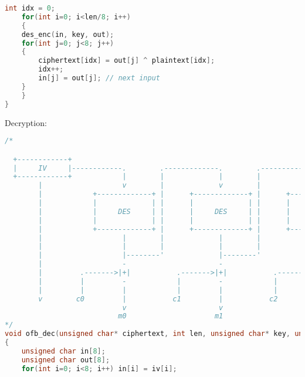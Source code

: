\documentclass{article}
\begin{document}
\begin{lstlisting}[language=c]
    int idx = 0;
    for(int i=0; i<len/8; i++)
    {
	des_enc(in, key, out);
	for(int j=0; j<8; j++)
	{
	    ciphertext[idx] = out[j] ^ plaintext[idx];
	    idx++;
	    in[j] = out[j]; // next input
	}
    }
}
\end{lstlisting}

Decryption:
\begin{lstlisting}[language=c]
/*

  +------------+                                                   
  |     IV     |------------.        .-------------.        .-------------.        .-  ...                                                                      
  +------------+            |        |             |        |             |        |                                                    
        |                   v        |             v        |             v        |                                                      
        |            +-------------+ |      +-------------+ |      +-------------+ |                                                
        |            |             | |      |             | |      |             | |                                                    
        |            |     DES     | |      |     DES     | |      |     DES     | |                                                      
        |            |             | |      |             | |      |             | |                                                    
        |            +-------------+ |      +-------------+ |      +-------------+ |                                                  
        |                   |        |             |        |             |        |                                                   
        |                   |        |             |        |             |        |                                                   
        |                   |--------'             |--------'             |--------'                                                   
        |                   -                      -                      -                                                                
        |         .------->|+|           .------->|+|           .------->|+|                                                             
        |         |         -            |         -            |         -                                                            
        |         |         |            |         |            |         |                                                             
        v        c0         |           c1         |           c2         |                                                               
                            v                      v                      v                                                          
                           m0                     m1                     m2                                                          
*/
void ofb_dec(unsigned char* ciphertext, int len, unsigned char* key, unsigned char* iv, unsigned char* decryptedtext)
{
    unsigned char in[8];
    unsigned char out[8];
    for(int i=0; i<8; i++) in[i] = iv[i];


\end{lstlisting}
\end{document}

